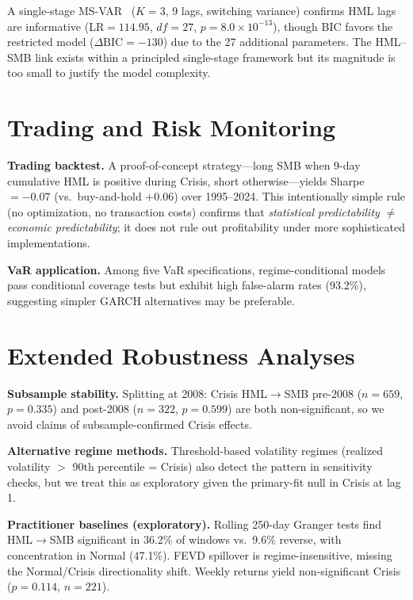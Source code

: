 \documentclass[sigconf,anonymous]{acmart}
\begin{document}
A single-stage MS-VAR~\cite{krolzig1997markov} ($K = 3$, 9 lags, switching variance)
confirms HML lags are informative ($\text{LR} = 114.95$, $df = 27$, $p = 8.0 \times 10^{-13}$),
though BIC favors the restricted model ($\Delta\text{BIC} = -130$) due to the 27 additional
parameters. The HML--SMB link exists within a principled single-stage framework
but its magnitude is too small to justify the model complexity.

\section{Trading and Risk Monitoring}
\label{app:trading}
\label{app:var}

\textbf{Trading backtest.}
A proof-of-concept strategy---long SMB when 9-day cumulative HML is positive
during Crisis, short otherwise---yields Sharpe $= -0.07$ (vs.\ buy-and-hold
$+0.06$) over 1995--2024. This intentionally simple rule (no optimization,
no transaction costs) confirms that \emph{statistical predictability}
$\neq$ \emph{economic predictability}; it does not rule out
profitability under more sophisticated implementations.

\textbf{VaR application.}
Among five VaR specifications, regime-conditional models pass conditional coverage tests but exhibit high false-alarm rates (93.2\%), suggesting simpler GARCH alternatives may be preferable.

\section{Extended Robustness Analyses}
\label{app:robustness}

\textbf{Subsample stability.} Splitting at 2008: Crisis HML$\to$SMB
pre-2008 ($n = 659$, $p = 0.335$) and post-2008 ($n = 322$, $p = 0.599$)
are both non-significant, so we avoid claims of subsample-confirmed Crisis effects.

\textbf{Alternative regime methods.} Threshold-based volatility regimes
(realized volatility $>$ 90th percentile = Crisis) also detect the pattern
in sensitivity checks, but we treat this as exploratory given the primary-fit
null in Crisis at lag 1.

\textbf{Practitioner baselines (exploratory).} Rolling 250-day Granger tests
find HML$\to$SMB significant in 36.2\% of windows vs.\ 9.6\% reverse,
with concentration in Normal (47.1\%). FEVD spillover is regime-insensitive,
missing the Normal/Crisis directionality shift.
Weekly returns yield non-significant Crisis ($p = 0.114$, $n = 221$).
\end{document}
